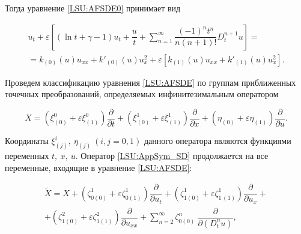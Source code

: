 Тогда уравнение \eqref{LSU:AFSDE0} принимает вид

\begin{multline}

\label{LSU:AFSDE}

u_t+\varepsilon \left[(\ln t + \gamma-1)u_t + \dfrac{u}{t} + \sum_{n=1}^{\infty} \dfrac{(-1)^n t^n}{n(n+1)!} D^{n+1}_t u \right]  = \\

=k_{(0)}(u) u_{xx} + k'_{(0)}(u) u_x^2 +\varepsilon [k_{(1)}(u) u_{xx} + k'_{(1)}(u) u_x^2].

\end{multline}






Проведем классификацию уравнения \eqref{LSU:AFSDE} по группам приближенных точечных преобразований, определяемых инфинитезимальным оператором

\begin{equation}

\label{LSU:AppSym_SD}

X=(\xi^0_{(0)}+\varepsilon \xi^0_{(1)}) \dfrac{\partial}{\partial t}  + 

(\xi^1_{(0)}+\varepsilon \xi^1_{(1)}) \dfrac{\partial}{\partial x} +

(\eta_{(0)}+\varepsilon \eta_{(1)}) \dfrac{\partial}{\partial u}.

\end{equation}

Координаты $\xi^i_{(j)}, \ \eta_{(j)} \ (i,j=0,1)$ данного оператора являются функциями переменных $t, \ x, \ u$. Оператор \eqref{LSU:AppSym_SD} продолжается на все переменные, входящие в уравнение \eqref{LSU:AFSDE}:

\begin{equation}

\label{LSU:Prod_X}

\begin{array}{c}

\tilde{X}=X+(\zeta_{0 (0)}^1+\varepsilon \zeta_{0  (1)}^1) \dfrac{\partial}{\partial u_t}+

(\zeta_{1 (0)}^1+\varepsilon \zeta_{1 \, (1)}^1) \dfrac{\partial}{\partial u_x}+ 

\\[1ex]

+(\zeta_{1 (0)}^2+\varepsilon \zeta_{1 (1)}^2) \dfrac{\partial}{\partial u_{xx}}+

\displaystyle\sum_{n=2}^{\infty} \zeta^{n}_{0(0)} \ \dfrac{\partial}{\partial \left(D^{n}_t u \right)},

\end{array}

\end{equation}

